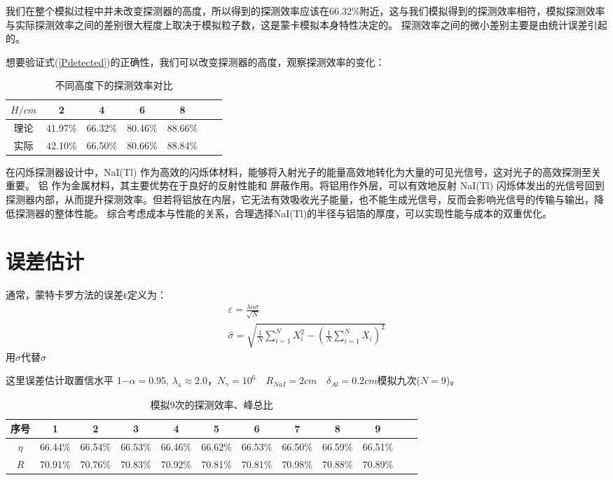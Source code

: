\documentclass{article}
\begin{document}
我们在整个模拟过程中并未改变探测器的高度，所以得到的探测效率应该在66.32\%附近，这与我们模拟得到的探测效率相符，模拟探测效率与实际探测效率之间的差别很大程度上取决于模拟粒子数，这是蒙卡模拟本身特性决定的。
探测效率之间的微小差别主要是由统计误差引起的。

想要验证式(\ref{Pdetected})的正确性，我们可以改变探测器的高度，观察探测效率的变化：
\begin{table}[h]
    \centering
    \caption{不同高度下的探测效率对比}
    \begin{tabular}{ccccccc}
        \hline
        $H/cm$& 2 & 4 & 6 & 8  \\
        \hline
        理论 & 41.97\% & 66.32\% & 80.46\% & 88.66\%   \\
        实际 & 42.10\% & 66.50\% & 80.66\% & 88.84\%   \\
        \hline
    \end{tabular}
\end{table}

在闪烁探测器设计中，NaI(Tl) 作为高效的闪烁体材料，能够将入射光子的能量高效地转化为大量的可见光信号，这对光子的高效探测至关重要。  
铝 作为金属材料，其主要优势在于良好的反射性能和 屏蔽作用。将铝用作外层，可以有效地反射 NaI(Tl) 闪烁体发出的光信号回到探测器内部，从而提升探测效率。但若将铝放在内层，它无法有效吸收光子能量，也不能生成光信号，反而会影响光信号的传输与输出，降低探测器的整体性能。  
综合考虑成本与性能的关系，合理选择NaI(Tl)的半径与铝箔的厚度，可以实现性能与成本的双重优化。


\section{误差估计}
通常，蒙特卡罗方法的误差ε定义为：
\begin{equation}
    \begin{gathered}
        \varepsilon = \frac{\lambda \alpha \sigma}{\sqrt{N}} \\
    \hat{\sigma}=\sqrt{\frac{1}{N}\sum_{i=1}^NX_i^2-\left(\frac{1}{N}\sum_{i=1}^NX_i\right)^2}
    \end{gathered}
    \label{error}
\end{equation}
用$\hat{\sigma}$代替$\sigma$

这里误差估计取置信水平 1$- \alpha = 0. 95$, $\lambda _{\mathrm{a} }\approx 2. 0$，$N_{\gamma }=10^6 \quad R_{NaI}=2cm\quad \delta _{Al}=0.2cm$模拟九次($N=9$)。

\begin{table}[H]
    \centering
    \caption{模拟9次的探测效率、峰总比}
    \begin{tabular}{cccccccccccc}
        \hline
        序号 & 1 & 2 & 3 & 4 & 5 & 6 & 7 & 8 & 9 \\
        \hline
        $\eta $ & 66.44\% & 66.54\% & 66.53\% & 66.46\% & 66.62\% & 66.53\% & 66.50\% & 66.59\% & 66.51\% \\
        
        $R $& 70.91\% & 70.76\% & 70.83\% & 70.92\% & 70.81\% & 70.81\% & 70.98\% & 70.88\% & 70.89\% \\
        \hline
    \end{tabular}
    \label{tab:example}
\end{table}
\end{document}
